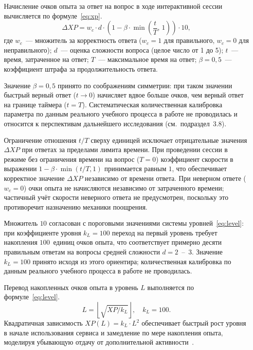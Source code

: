 Начисление очков опыта за ответ на вопрос в ходе интерактивной
сессии вычисляется по формуле~\eqref{eq:xp}.
\begin{equation}\label{eq:xp}
    \Delta XP = w_c \cdot d \cdot \left(1 - \beta \cdot \min\!\left(\frac{t}{T},\,1\right)\right) \cdot 10,
\end{equation}
где $w_c$~--- множитель за корректность ответа ($w_c = 1$
для правильного, $w_c = 0$ для неправильного); $d$~--- оценка
сложности вопроса (целое число от 1 до 5); $t$~--- время,
затраченное на ответ; $T$~--- максимальное время на ответ;
$\beta = 0{,}5$~--- коэффициент штрафа за продолжительность
ответа.

Значение $\beta = 0{,}5$ принято по соображениям симметрии: при
таком значении быстрый верный ответ ($t \to 0$) начисляет вдвое
больше очков, чем верный ответ на границе таймера ($t = T$).
Систематическая количественная калибровка параметра по данным
реального учебного процесса в работе не проводилась и относится
к перспективам дальнейшего исследования (см.~подраздел~3.8).

Ограничение отношения $t/T$ сверху единицей исключает отрицательные
значения $\Delta XP$ при ответах за пределами лимита времени.
При проведении сессии в режиме без ограничения времени на вопрос
($T = 0$) коэффициент скорости в выражении
$1 - \beta \cdot \min(t/T, 1)$ принимается равным $1$, что
обеспечивает корректное значение $\Delta XP$ независимо от времени
ответа. При неверном ответе ($w_c = 0$) очки опыта не начисляются
независимо от затраченного времени; частичный учёт скорости
неверного ответа не предусмотрен, поскольку это противоречит
назначению механики поощрения.

Множитель $10$ согласован с пороговыми значениями системы
уровней~\eqref{eq:level}: при коэффициенте уровня $k_L = 100$
переход на первый уровень требует накопления $100$~единиц очков
опыта, что соответствует примерно десяти правильным ответам
на вопросы средней сложности $d = 2$~--~$3$. Значение $k_L = 100$
принято исходя из этого ориентира; количественная калибровка
по данным реального учебного процесса в работе не проводилась.

Перевод накопленных очков опыта в уровень $L$ выполняется
по формуле~\eqref{eq:level}.
\begin{equation}\label{eq:level}
    L = \left\lfloor \sqrt{XP / k_L} \right\rfloor, \quad k_L = 100.
\end{equation}
Квадратичная зависимость $XP(L) = k_L \cdot L^2$ обеспечивает
быстрый рост уровня в начале использования сервиса и замедление
по мере накопления опыта, моделируя убывающую отдачу
от дополнительной активности~\cite{sailer2020}.

